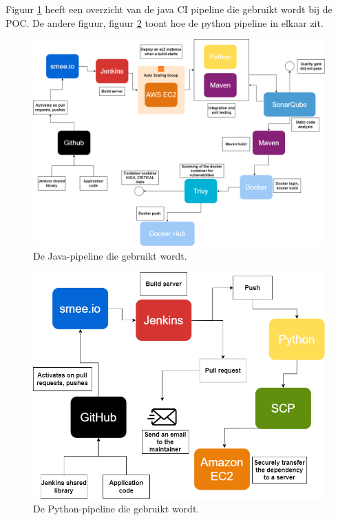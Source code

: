 Figuur \ref{fig:CIpipe} heeft een overzicht van de java CI pipeline die gebruikt wordt bij de POC. De andere figuur, figuur \ref{fig:CIpipep} toont hoe de python pipeline in elkaar zit.
\newline

\begin{figure}[H]
  \includegraphics[scale=0.35]{graphics/CIpipe.png}
\caption{\label{fig:CIpipe} De Java-pipeline die gebruikt wordt.}
\end{figure}

\begin{figure}[H]
  \includegraphics[scale=0.35]{graphics/CIpipep.png}
\caption{\label{fig:CIpipep} De Python-pipeline die gebruikt wordt.}
\end{figure}
\clearpage

